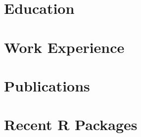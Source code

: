 \documentclass[letterpaper, 10.5pt, sans]{moderncv}
\begin{document}
\makecvtitle

\vspace*{-35pt}

\section{Education}







\vspace{-10pt}
\section{Work Experience}


\vspace{-10pt}
\vspace{-3pt}










\vspace{-5pt}


\section{Publications}
\vspace{-5pt}







\newpage


\section{Recent R Packages}






\end{document}
